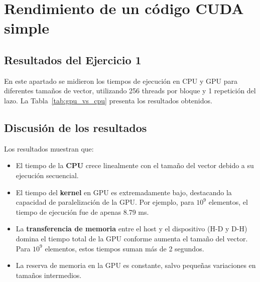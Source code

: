 \documentclass[twocolumn,a4paper,12pt]{article}
\begin{document}
\section{Rendimiento de un código CUDA simple}

\subsection{Resultados del Ejercicio 1}

En este apartado se midieron los tiempos de ejecución en CPU y GPU para diferentes tamaños de vector, utilizando 256 threads por bloque y 1 repetición del lazo. La Tabla~\ref{tab:gpu_vs_cpu} presenta los resultados obtenidos.

\begin{table}[H]
    \centering
    \caption{Comparación de tiempos entre CPU y GPU para distintos tamaños de vector}
    \label{tab:gpu_vs_cpu}
\end{table}

\subsection{Discusión de los resultados}
Los resultados muestran que:
\begin{itemize}
    \item El tiempo de la \textbf{CPU} crece linealmente con el tamaño del vector debido a su ejecución secuencial.
    \item El tiempo del \textbf{kernel} en GPU es extremadamente bajo, destacando la capacidad de paralelización de la GPU. Por ejemplo, para $10^9$ elementos, el tiempo de ejecución fue de apenas 8.79 ms.
    \item La \textbf{transferencia de memoria} entre el host y el dispositivo (H-D y D-H) domina el tiempo total de la GPU conforme aumenta el tamaño del vector. Para $10^9$ elementos, estos tiempos suman más de 2 segundos.
    \item La reserva de memoria en la GPU es constante, salvo pequeñas variaciones en tamaños intermedios.
\end{itemize}
\end{document}
